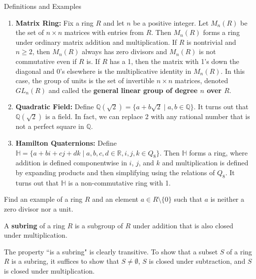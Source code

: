 \begin{section}{Definitions and Examples}
\begin{example}
\begin{enumerate}[label=\textrm{(\alph*)}]
\item \textbf{Matrix Ring:} Fix a ring $R$ and let $n$ be a positive integer.  Let $M_n(R)$ be the set of $n\times n$ matrices with entries from $R$.  Then $M_n(R)$ forms a ring under ordinary matrix addition and multiplication.  If $R$ is nontrivial and $n\geq 2$, then $M_n(R)$ always has zero divisors and $M_n(R)$ is not commutative even if $R$ is.  If $R$ has a 1, then the matrix with 1's down the diagonal and 0's elsewhere is the multiplicative identity in $M_n(R)$.  In this case, the group of units is the set of invertible $n\times n$ matrices, denoted $GL_n(R)$ and called the \textbf{general linear group of degree $n$ over $R$}.
\item \textbf{Quadratic Field:} Define $\mathbb{Q}(\sqrt{2})=\{a+b\sqrt{2}\mid a,b\in\mathbb{Q}\}$.  It turns out that $\mathbb{Q}(\sqrt{2})$ is a field.  In fact, we can replace 2 with any rational number that is not a perfect square in $\mathbb{Q}$.
\item \textbf{Hamilton Quaternions:} Define $\mathbb{H}=\{a+bi+cj+dk\mid a,b,c,d\in\mathbb{R}, i,j,k\in Q_8\}$.  Then $\mathbb{H}$ forms a ring, where addition is defined componentwise in $i$, $j$, and $k$ and multiplication is defined by expanding products and then simplifying using the relations of $Q_8$.  It turns out that $\mathbb{H}$ is a non-commutative ring with 1.
\end{enumerate}
\end{example}

\begin{problem}
Find an example of a ring $R$ and an element $a\in R\setminus\{0\}$ such that $a$ is neither a zero divisor nor a unit.
\end{problem}

\begin{definition}
A \textbf{subring} of a ring $R$ is a subgroup of $R$ under addition that is also closed under multiplication.
\end{definition}

\begin{remark}
The property ``is a subring" is clearly transitive. To show that a subset $S$ of a ring $R$ is a subring, it suffices to show that $S\neq \emptyset$, $S$ is closed under subtraction, and $S$ is closed under multiplication.
\end{remark}


\end{section}

